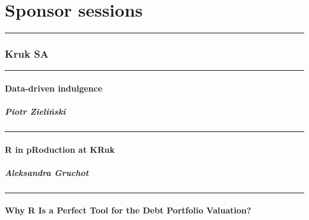 \documentclass [12pt]{article}
\begin{document}
\part{Sponsor sessions}


\noindent\rule{\textwidth}{1pt}
\section{Kruk SA}
\noindent\rule{\textwidth}{0.1pt}
\subsection{Data-driven indulgence}
\subsubsection*{Piotr Zieliński}

\noindent\rule{\textwidth}{0.1pt}
\subsection{R in pRoduction at KRuk}
\subsubsection*{Aleksandra Gruchot}

\noindent\rule{\textwidth}{0.1pt}
\subsection{Why R Is a Perfect Tool for the Debt Portfolio Valuation?}
\end{document}

